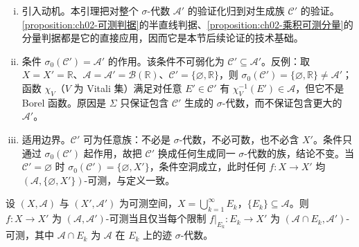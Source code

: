 \documentclass[../../main.tex]{subfiles}%
\begin{document}
\begin{remark}\label{remark:ch02-生成族}
\begin{enumerate}[(i)]
\item 引入动机。本引理把对整个 $\sigma$-代数 $\mathscr A'$ 的验证化归到对生成族 $\mathscr C'$ 的验证。\cref{proposition:ch02-可测判据}的半直线判据、\cref{proposition:ch02-乘积可测分量}的分量判据都是它的直接应用，因而它是本节后续论证的技术基础。
\item 条件 $\sigma_0(\mathscr C')=\mathscr A'$ 的作用。该条件不可弱化为 $\mathscr C'\subseteq\mathscr A'$。反例：取 $X=X'=\mathbb{R}$、$\mathscr A=\mathscr A'=\mathscr B(\mathbb{R})$、$\mathscr C'=\{\varnothing,\mathbb{R}\}$，则 $\sigma_0(\mathscr C')=\{\varnothing,\mathbb{R}\}\neq\mathscr A'$；函数 $\chi_V$（$V$ 为 Vitali 集）满足对任意 $E'\in\mathscr C'$ 有 $\chi_V^{-1}(E')\in\mathscr A$，但它不是 Borel 函数。原因是 $\Sigma$ 只保证包含 $\mathscr C'$ 生成的 $\sigma$-代数，而不保证包含更大的 $\mathscr A'$。
\item 适用边界。$\mathscr C'$ 可为任意族：不必是 $\sigma$-代数，不必可数，也不必含 $X'$。条件只通过 $\sigma_0(\mathscr C')$ 起作用，故把 $\mathscr C'$ 换成任何生成同一 $\sigma$-代数的族，结论不变。当 $\mathscr C'=\varnothing$ 时 $\sigma_0(\mathscr C')=\{\varnothing,X'\}$，条件空洞成立，此时任何 $f:X\to X'$ 均 $(\mathscr A,\{\varnothing,X'\})$-可测，与定义一致。
\end{enumerate}
\end{remark}

\begin{proposition}\label{proposition:ch02-限制可测}\label{proposition:ch02-可测拼接}
设 $(X,\mathscr A)$ 与 $(X',\mathscr A')$ 为可测空间，$X=\bigcup_{k=1}^\infty E_k$，$\{E_k\}\subseteq\mathscr A$。则 $f:X\to X'$ 为 $(\mathscr A,\mathscr A')$-可测当且仅当每个限制 $f|_{E_k}:E_k\to X'$ 为 $(\mathscr A\cap E_k,\mathscr A')$-可测，其中 $\mathscr A\cap E_k$ 为 $\mathscr A$ 在 $E_k$ 上的迹 $\sigma$-代数。
\end{proposition}
\end{document}
